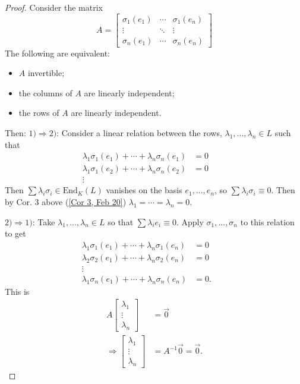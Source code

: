 \begin{proof}
	Consider the matrix
		\[A = \begin{bmatrix}
		\sigma_1(e_1) & \cdots & \sigma_1(e_n) \\
		\vdots & \ddots & \vdots \\
		\sigma_n(e_1) & \cdots & \sigma_n(e_n)
		\end{bmatrix}\]
	The following are equivalent:
	\begin{itemize}
		\item $A$ invertible;
		\item the columns of $A$ are linearly independent;
		\item the rows of $A$ are linearly independent.
	\end{itemize}
	Then: $1) \Rightarrow 2)$: Consider a linear relation between the rows, $\lambda_1, ..., \lambda_n \in L$ such that
	\begin{align*}
		\lambda_1\sigma_1(e_1) + \cdots + \lambda_n\sigma_n(e_1) &= 0 \\
		\lambda_1\sigma_1(e_2) + \cdots + \lambda_n\sigma_n(e_2) &= 0 \\
		\vdots &\qquad \qquad
	\end{align*}
	Then $\sum \lambda_i\sigma_i \in \text{End}_K(L)$ vanishes on the basis $e_1, ..., e_n$, so $\sum \lambda_i\sigma_i \equiv 0$. Then by Cor. 3 above (\ref{Cor 3, Feb 20}) $\lambda_1 = \cdots = \lambda_n = 0$.

	$2) \Rightarrow 1)$: Take $\lambda_1, ..., \lambda_n \in L$ so that $\sum \lambda_ie_i \equiv 0$. Apply $\sigma_1, ..., \sigma_n$ to this relation to get
	\begin{align*}
		\lambda_1\sigma_1(e_1) + \cdots + \lambda_n\sigma_1(e_n) &= 0 \\
		\lambda_2\sigma_2(e_1) + \cdots + \lambda_n\sigma_2(e_n) &= 0 \\
		\vdots &\qquad \qquad \\
		\lambda_1\sigma_n(e_1) + \cdots + \lambda_n\sigma_n(e_n) &= 0.
	\end{align*}
	This is
	\begin{align*}
		A\begin{bmatrix} \lambda_1 \\ \vdots \\ \lambda_n \end{bmatrix} &= \overrightarrow{0} \\
		\Rightarrow \begin{bmatrix} \lambda_1 \\ \vdots \\ \lambda_n \end{bmatrix} &= A^{-1}\overrightarrow{0} = \overrightarrow{0}.
	\end{align*}
\end{proof}
